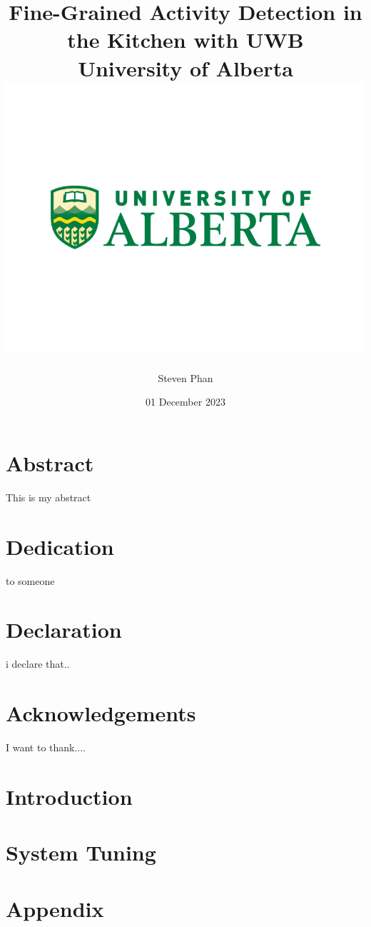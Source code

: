 \documentclass[12pt]{report}
\title{
    {Fine-Grained Activity Detection in the Kitchen with UWB}\\
    {\large University of Alberta}\\
    {\includegraphics[width=\textwidth]{university.png}}
}
\author{Steven Phan}
\date{01 December 2023}
\begin{document}
\maketitle

\chapter*{Abstract}
This is my abstract
\chapter*{Dedication}
to someone
\chapter*{Declaration}
i declare that..
\chapter*{Acknowledgements}
I want to thank....
\tableofcontents

\chapter{Introduction}


\chapter{System Tuning}


\appendix
\chapter{Appendix}





\end{document}
